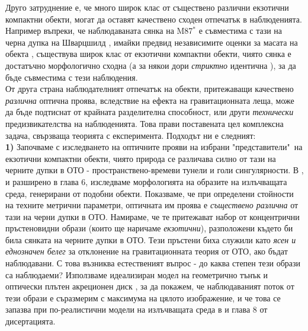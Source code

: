 \documentclass[12pt]{article}
\numberwithin{equation}{section}
\numberwithin{figure}{section}
\begin{document}
	\noindent Друго затруднение е, че много широк клас от съществено различни екзотични компактни обекти, могат да оставят качествено сходен отпечатък в наблюденията. Например въпреки, че наблюдаваната сянка на M87$^*$ е съвместима с тази на черна дупка на Шварцшилд \cite{EHT_M87_I}, имайки предвид независимите оценки за масата на обекта \cite{Gebhardt_2011}, съществува широк клас от екзотични компактни обекти, чиято сянка е достатъчно морфологично сходна (а за някои дори \emph{стриктно} идентична \cite{PhysRevD.103.084040}), за да бъде съвместима с тези наблюдения.\\
	
	\noindent От друга страна наблюдателният отпечатък на обекти, притежаващи качествено \emph{различна} оптична проява, вследствие на ефекта на гравитационната леща, може да бъде подтиснат от крайната разделителна способност, или други \emph{технически} предизвикателства на наблюденията. Това прави поставената цел комплексна задача, свързваща теорията с експеримента. Подходът ни е следният:\\
	
	\textbf{1)} Започваме с изследването на оптичните прояви на избрани "представители"$\,$ на екзотични компактни обекти, чиято природа се различава силно от тази на черните дупки в ОТО - пространствено-времеви тунели и голи сингулярности. В \cite{Deliyski2022}, и разширено в глава 6, изследваме морфологията на образите на излъчващата среда, генерирани от подобни обекти. Показваме, че при определени стойности на техните метрични параметри, оптичната им проява е \emph{съществено различна} от тази на черни дупки в ОТО. Намираме, че те притежават набор от концентрични пръстеновидни образи (които ще наричаме \emph{екзотични}), разположени където би била сянката на черните дупки в ОТО. Тези пръстени биха служили като \emph{ясен и еднозначен белег} за отклонение на гравитационната теория от ОТО, ако бъдат наблюдавани. С това възниква естественият въпрос - до каква степен тези образи са наблюдаеми? Използваме идеализиран модел на геометрично тънък и оптически плътен акреционен диск \cite{Page1973}, за да покажем, че наблюдаваният поток от тези образи е съразмерим с максимума на цялото изображение, и че това се запазва при по-реалистични модели на излъчващата среда в \cite{Deliyski2024} и глава 8 от дисертацията.\\
	
\end{document}
